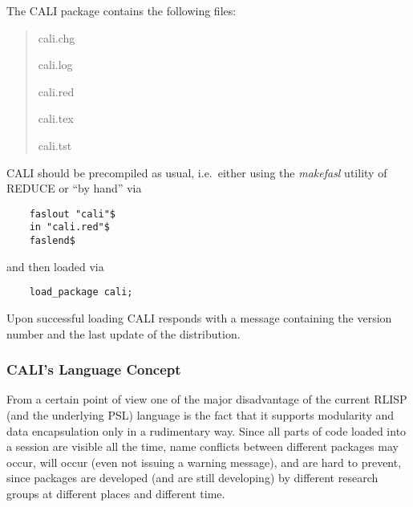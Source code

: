 The CALI package contains the following files:
\begin{quote}
cali.chg


cali.log


cali.red


cali.tex


cali.tst


\end{quote}

CALI should be precompiled as usual, i.e.\ either using the {\em
makefasl} utility of REDUCE or ``by hand'' via
\begin{verbatim}
    faslout "cali"$
    in "cali.red"$
    faslend$
\end{verbatim}
and then loaded via
\begin{verbatim}
    load_package cali;
\end{verbatim}
Upon successful loading CALI responds with a message containing the
version number and the last update of the distribution.

\begin{center}
\end{center}

\subsubsection{CALI's Language Concept}

From a certain point of view one of the major disadvantage of the
current RLISP (and the underlying PSL) language is the fact
that it supports modularity and data encapsulation only in a
rudimentary way.  Since all parts of code loaded into a session are
visible all the time, name conflicts between different packages may
occur, will occur (even not issuing a warning message), and are hard
to prevent, since packages are developed (and are still developing)
by different research groups at different places and different time.

